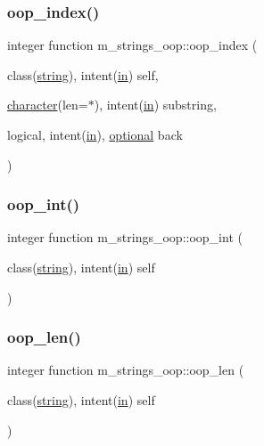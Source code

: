 \subsubsection{\texorpdfstring{oop\+\_\+index()}{oop\_index()}}
{\footnotesize\ttfamily integer function m\+\_\+strings\+\_\+oop\+::oop\+\_\+index (\begin{DoxyParamCaption}\item[{class(\hyperlink{structm__strings__oop_1_1string}{string}), intent(\hyperlink{M__journal_83_8txt_afce72651d1eed785a2132bee863b2f38}{in})}]{self,  }\item[{\hyperlink{option__stopwatch_83_8txt_abd4b21fbbd175834027b5224bfe97e66}{character}(len=$\ast$), intent(\hyperlink{M__journal_83_8txt_afce72651d1eed785a2132bee863b2f38}{in})}]{substring,  }\item[{logical, intent(\hyperlink{M__journal_83_8txt_afce72651d1eed785a2132bee863b2f38}{in}), \hyperlink{option__stopwatch_83_8txt_aa4ece75e7acf58a4843f70fe18c3ade5}{optional}}]{back }\end{DoxyParamCaption})\hspace{0.3cm}{\ttfamily [private]}}

\mbox{\label{namespacem__strings__oop_a2092266bec4014f74b8d436c5a8e319f}} 
\subsubsection{\texorpdfstring{oop\+\_\+int()}{oop\_int()}}
{\footnotesize\ttfamily integer function m\+\_\+strings\+\_\+oop\+::oop\+\_\+int (\begin{DoxyParamCaption}\item[{class(\hyperlink{structm__strings__oop_1_1string}{string}), intent(\hyperlink{M__journal_83_8txt_afce72651d1eed785a2132bee863b2f38}{in})}]{self }\end{DoxyParamCaption})\hspace{0.3cm}{\ttfamily [private]}}

\mbox{\label{namespacem__strings__oop_a768ea13372aadbeae760c72d0b2a1939}} 
\subsubsection{\texorpdfstring{oop\+\_\+len()}{oop\_len()}}
{\footnotesize\ttfamily integer function m\+\_\+strings\+\_\+oop\+::oop\+\_\+len (\begin{DoxyParamCaption}\item[{class(\hyperlink{structm__strings__oop_1_1string}{string}), intent(\hyperlink{M__journal_83_8txt_afce72651d1eed785a2132bee863b2f38}{in})}]{self }\end{DoxyParamCaption})\hspace{0.3cm}{\ttfamily [private]}}

